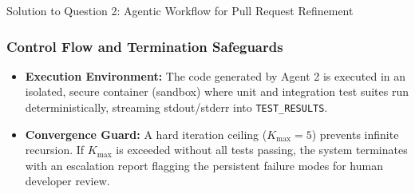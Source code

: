 \documentclass[11pt,a4paper]{article}
\begin{document}
\begin{solutionbox}{Solution to Question 2: Agentic Workflow for Pull Request Refinement}
\subsubsection*{Control Flow and Termination Safeguards}
\begin{itemize}[leftmargin=1.5em,noitemsep]
    \item \textbf{Execution Environment:} The code generated by Agent 2 is executed in an isolated, secure container (sandbox) where unit and integration test suites run deterministically, streaming stdout/stderr into \texttt{TEST\_RESULTS}.
    \item \textbf{Convergence Guard:} A hard iteration ceiling ($K_{\max} = 5$) prevents infinite recursion. If $K_{\max}$ is exceeded without all tests passing, the system terminates with an escalation report flagging the persistent failure modes for human developer review.
\end{itemize}
\end{solutionbox}

\vspace{0.4cm}
\end{document}
